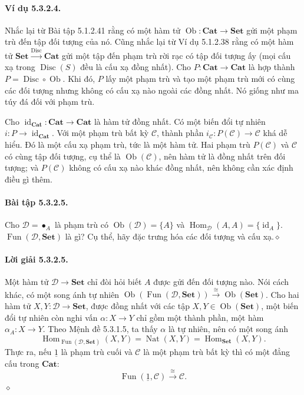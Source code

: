 \paragraph{Ví dụ 5.3.2.4.} Nhắc lại từ Bài tập 5.1.2.41 rằng có một hàm tử $\operatorname{Ob}:\mathbf{Cat}\to\mathbf{Set}$ gửi một phạm trù đến tập đối tượng của nó. Cũng nhắc lại từ Ví dụ 5.1.2.38 rằng có một hàm tử $\mathbf{Set}\xrightarrow{\operatorname{Disc}}\mathbf{Cat}$ gửi một tập đến phạm trù rời rạc có tập đối tượng ấy (mọi cấu xạ trong $\operatorname{Disc}(S)$ đều là cấu xạ đồng nhất). Cho $P:\mathbf{Cat}\to\mathbf{Cat}$ là hợp thành $P=\operatorname{Disc}\circ\operatorname{Ob}$. Khi đó, $P$ lấy một phạm trù và tạo một phạm trù mới có cùng các đối tượng nhưng không có cấu xạ nào ngoài các đồng nhất. Nó giống như ma túy đá đối với phạm trù.

Cho $\operatorname{id}_{\mathbf{Cat}}:\mathbf{Cat}\to\mathbf{Cat}$ là hàm tử đồng nhất. Có một biến đổi tự nhiên $i:P\to\operatorname{id}_{\mathbf{Cat}}$. Với một phạm trù bất kỳ $\mathcal C$, thành phần $i_{\mathcal C}:P(\mathcal C)\to\mathcal C$ khá dễ hiểu. Đó là một cấu xạ phạm trù, tức là một hàm tử. Hai phạm trù $P(\mathcal C)$ và $\mathcal C$ có cùng tập đối tượng, cụ thể là $\operatorname{Ob}(\mathcal C)$, nên hàm tử là đồng nhất trên đối tượng; và $P(\mathcal C)$ không có cấu xạ nào khác đồng nhất, nên không cần xác định điều gì thêm.
\paragraph{Bài tập 5.3.2.5.} Cho $\mathcal D=\bullet_A$ là phạm trù có $\operatorname{Ob}(\mathcal D)=\{A\}$ và $\operatorname{Hom}_{\mathcal D}(A,A)=\{\operatorname{id}_A\}$. $\operatorname{Fun}(\mathcal D,\mathbf{Set})$ là gì? Cụ thể, hãy đặc trưng hóa các đối tượng và cấu xạ.\hfill$\diamond$
\paragraph{Lời giải 5.3.2.5.} Một hàm tử $\mathcal D\to\mathbf{Set}$ chỉ đòi hỏi biết $A$ được gửi đến đối tượng nào. Nói cách khác, có một song ánh tự nhiên $\operatorname{Ob}(\operatorname{Fun}(\mathcal D,\mathbf{Set}))\xrightarrow{\cong}\operatorname{Ob}(\mathbf{Set})$. Cho hai hàm tử $X,Y:\mathcal D\to\mathbf{Set}$, được đồng nhất với các tập $X,Y\in\operatorname{Ob}(\mathbf{Set})$, một biến đổi tự nhiên còn nghi vấn $\alpha:X\to Y$ chỉ gồm một thành phần, một hàm $\alpha_A:X\to Y$. Theo Mệnh đề 5.3.1.5, ta thấy $\alpha$ là tự nhiên, nên có một song ánh
\[\operatorname{Hom}_{\operatorname{Fun}(\mathcal D,\mathbf{Set})}(X,Y)=\operatorname{Nat}(X,Y)=\operatorname{Hom}_{\mathbf{Set}}(X,Y).\]
Thực ra, nếu $\underline{1}$ là phạm trù cuối và $\mathcal C$ là một phạm trù bất kỳ thì có một đẳng cấu trong $\mathbf{Cat}$:
\begin{equation*}\operatorname{Fun}(\underline{1},\mathcal C)\xrightarrow{\cong}\mathcal C.\tag{5.14}\end{equation*}\hfill$\diamond$
